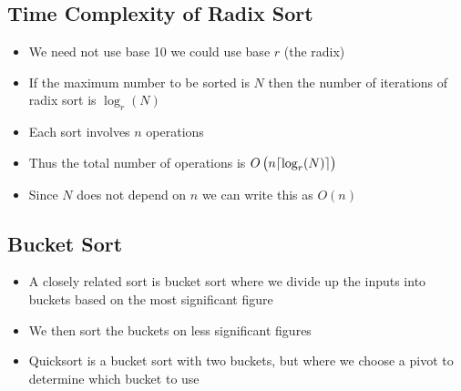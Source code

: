 \begin{slide}
\section{Time Complexity of Radix Sort}

\begin{PauseHighLight}
  \begin{itemize}
  \item We need not use base 10 we could use base $r$ (the radix)\pause
  \item If the maximum number to be sorted is $N$ then the number of
    iterations of radix sort is $\log_r(N)$\pause
  \item Each sort involves $n$ operations\pause
  \item Thus the total number of operations is $O\left(\strut n \lceil \log_r(N)
    \rceil \right)$\pause
  \item Since $N$ does not depend on $n$ we can write this as
  $O\left(n\right)$ \pause
  \end{itemize}
\end{PauseHighLight}

\end{slide}


\begin{slide}
\section{Bucket Sort}

\begin{PauseHighLight}
  \begin{itemize}
  \item A closely related sort is bucket sort where we divide up the
    inputs into buckets based on the most significant figure\pause
  \item We then sort the buckets on less significant figures\pause
  \item Quicksort is a bucket sort with two buckets, but where we choose
    a pivot to determine which bucket to use\pause
  \end{itemize}
\end{PauseHighLight}

\end{slide}


